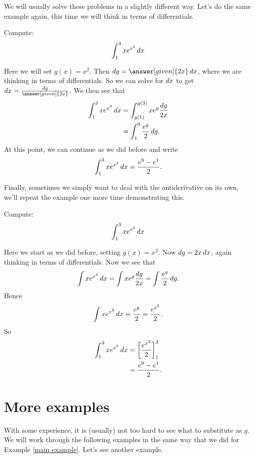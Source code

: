 \documentclass{ximera}
\begin{document}
We will usually solve these problems in a slightly different
way. Let's do the same example again, this time we will think in terms
of differentials.

\begin{example}\label{main example}
Compute:
\[
\int_1^3 x e^{x^{2}}\mathop{}\!d x
\]
\begin{explanation}
Here we will set $g(x) = x^2$. Then $\d g = \answer[given]{2x} \d x$,
where we are thinking in terms of differentials. So we can solve for
$\mathop{}\!d x$ to get $\d x = \frac{\d g}{\answer[given]{2x}}$.  We then see
that
\begin{align*}
  \int_1^3 x e^{x^{2}} \mathop{}\!d x &= \int_{g(1)}^{g(3)} x e^{g} \frac{\mathop{}\!d g}{2x}\\
  &= \int_{1}^{9} \frac{e^{g}}{2}\mathop{}\!d g .
\end{align*}
At this point, we can continue as we did before and write
\[
\int_1^3 x e^{x^{2}}\mathop{}\!d x= \frac{e^{9} -e^{1}}{2}.
\]
\end{explanation}
\end{example}

Finally, sometimes we simply want to deal with the antiderivative on
its own, we'll repeat the example one more time demonstrating this.

\begin{example}
Compute:
\[
\int_1^3 x e^{x^{2}}\mathop{}\!d x
\]
\begin{explanation}
Here we start as we did before, setting $g(x)=x^2$. Now $\mathop{}\!d g =  2x \mathop{}\!d x$,
again thinking in terms of differentials. Now we see that
\[
\int x e^{x^{2}} \mathop{}\!d x = \int x e^{g} \frac{\mathop{}\!d g}{2x} = \int \frac{e^{g}}{2}\mathop{}\!d g .
\]
Hence 
\[
\int x e^{x^{2}}\mathop{}\!d x = \frac{e^{g}}{2} = \frac{e^{x^{2}}}{2}.
\]
So
\begin{align*}
\int_1^3 x e^{x^{2}}\mathop{}\!d x &=\bigg[ \frac{e^{x^{2}}}{2} \bigg]_1^3\\
&= \frac{e^{9} -e^{1}}{2}.
\end{align*}
\end{explanation}
\end{example}

\section{More examples}

With some experience, it is (usually) not too hard to see what to
substitute as $g$.  We will work through the following examples in the
same way that we did for Example \ref{main example}. Let's see another
example.
\end{document}
